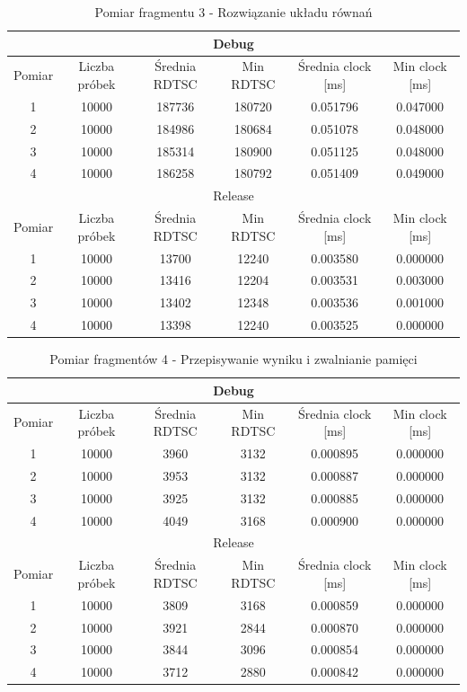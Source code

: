 \documentclass[12pt]{report}
\begin{document}
	\begin{table}[H]
		\centering
		\caption{Pomiar fragmentu 3 - Rozwiązanie układu równań}
		\begin{tabular}{|c|c|c|c|c|c|} \hline
			\multicolumn{6}{|c|}{Debug} \\\hline
			Pomiar  & Liczba próbek & Średnia RDTSC & Min RDTSC & Średnia clock [ms] & Min clock [ms] \\\hline
			1 & 10000 & 187736 & 180720 & 0.051796 & 0.047000 \\\hline
			2 & 10000 & 184986 & 180684 & 0.051078 & 0.048000 \\\hline
			3 & 10000 & 185314 & 180900 & 0.051125 & 0.048000 \\\hline
			4 & 10000 & 186258 & 180792 & 0.051409 & 0.049000 \\\hline
			\hline
			\multicolumn{6}{|c|}{Release} \\\hline
			Pomiar  & Liczba próbek & Średnia RDTSC & Min RDTSC & Średnia clock [ms] & Min clock [ms] \\\hline
			1 & 10000 & 13700 & 12240 & 0.003580 & 0.000000 \\\hline
			2 & 10000 & 13416 & 12204 & 0.003531 & 0.003000 \\\hline
			3 & 10000 & 13402 & 12348 & 0.003536 & 0.001000 \\\hline
			4 & 10000 & 13398 & 12240 & 0.003525 & 0.000000 \\\hline
			
		\end{tabular}
	\end{table}
	
	\begin{table}[H]
		\centering
		\caption{Pomiar fragmentów 4 - Przepisywanie wyniku i zwalnianie pamięci}
		\begin{tabular}{|c|c|c|c|c|c|} \hline
			\multicolumn{6}{|c|}{Debug} \\\hline
			Pomiar  & Liczba próbek & Średnia RDTSC & Min RDTSC & Średnia clock [ms] & Min clock [ms] \\\hline
			1 & 10000 & 3960 & 3132 & 0.000895 & 0.000000 \\\hline
			2 & 10000 & 3953 & 3132 & 0.000887 & 0.000000 \\\hline
			3 & 10000 & 3925 & 3132 & 0.000885 & 0.000000 \\\hline
			4 & 10000 & 4049 & 3168 & 0.000900 & 0.000000 \\\hline
			\hline
			\multicolumn{6}{|c|}{Release} \\\hline
			Pomiar  & Liczba próbek & Średnia RDTSC & Min RDTSC & Średnia clock [ms] & Min clock [ms] \\\hline
			1 & 10000 & 3809 & 3168 & 0.000859 & 0.000000 \\\hline
			2 & 10000 & 3921 & 2844 & 0.000870 & 0.000000 \\\hline
			3 & 10000 & 3844 & 3096 & 0.000854 & 0.000000 \\\hline
			4 & 10000 & 3712 & 2880 & 0.000842 & 0.000000 \\\hline
		\end{tabular}
	\end{table}
	
\end{document}
